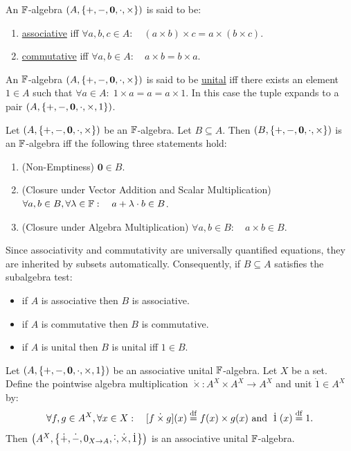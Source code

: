 \documentclass[11pt,reqno]{amsart}
\newcommand{\pwplus}{\mathbin{\dot{+}}}
\newcommand{\pwminus}{\mathbin{\dot{-}}}
\newcommand{\pwcdot}{\mathbin{\dot{\cdot}}}
\newcommand{\pwtimes}{\mathbin{\dot{\times}}}
\newcommand{\pwone}{\mathbin{\dot{1}}}
\begin{document}
\begin{Def}
An $\mathbb{F}$-algebra $(A,\set{+,-,\bm0,\cdot,\times})$ is said to be:
\begin{enumerate}
\item \ul{associative} iff
$\forall a,b,c\in A:\quad (a\times b)\times c=a\times(b\times c)$.
\item \ul{commutative} iff
$\forall a,b\in A:\quad a\times b=b\times a$.
\end{enumerate}
\end{Def}

\begin{Def}
An $\mathbb{F}$-algebra $(A,\set{+,-,\bm0,\cdot,\times})$ is said to be \ul{unital} iff
there exists an element $1\in A$ such that
$\forall a\in A:\;1\times a=a=a\times 1$.
In this case the tuple expands to a pair $(A,\set{+,-,\bm0,\cdot,\times,1})$.
\end{Def}

\begin{Thm}\label{thm:subalgebra-test}
Let $\Br{A,\set{+,-,\bm0,\cdot,\times}}$ be an $\mathbb{F}$-algebra.
Let $B\subseteq A$.
Then $\Br{B,\set{+,-,\bm0,\cdot,\times}}$ is an $\mathbb{F}$-algebra iff the following three statements hold:
\begin{enumerate}
\item (Non-Emptiness) $\bm0\in B$.
\item (Closure under Vector Addition and Scalar Multiplication)
$\forall a,b\in B,\forall\lambda\in\mathbb{F}:\quad a+\lambda\cdot b\in B$.
\item (Closure under Algebra Multiplication)
$\forall a,b\in B:\quad a\times b\in B$.
\end{enumerate}
\end{Thm}

\begin{remark}
Since associativity and commutativity are universally quantified equations,
they are inherited by subsets automatically. Consequently,
if $B\subseteq A$ satisfies the subalgebra test:
\begin{itemize}
\item if $A$ is associative then $B$ is associative.
\item if $A$ is commutative then $B$ is commutative.
\item if $A$ is unital then $B$ is unital iff $1\in B$.
\end{itemize}
\end{remark}

\begin{Thm}
\label{thm:AX-algebra}
Let $(A,\set{+,-,\bm0,\cdot,\times,1})$ be an associative unital $\mathbb{F}$-algebra.
Let $X$ be a set.
Define the pointwise algebra multiplication $\pwtimes:A^X\times A^X\to A^X$
and unit $\pwone\in A^X$ by:
\[\forall f,g\in A^X,\forall x\in X:\quad
\FUNC{f\pwtimes g}{x}\df f(x)\times g(x)\tand
\pwone(x)\df 1.\]
Then $\Br{A^X,\set{\pwplus,\pwminus,0_{X\to A},\pwcdot,\pwtimes,\pwone}}$ is an associative unital $\mathbb{F}$-algebra.
\end{Thm}
\end{document}
